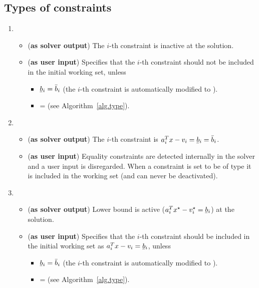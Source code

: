 \documentclass[12pt,a4paper]{article}
\newcommand{\ubar}[1]{\underaccent{\bar}{#1}}
\begin{document}
\subsection{Types of constraints}

\begin{enumerate}
\item {}

  \begin{itemize}
  \item ({\bf as solver output}) The $i$-th constraint is inactive at the solution. 
  \item ({\bf as user input}) Specifies that the $i$-th constraint should not be included in
    the initial working set, unless
    \begin{itemize}
    \item[\ding{237}] $\ubar{b}_i = \bar{b}_i$ (the $i$-th constraint is automatically modified to
      ).
    \item[\ding{237}]  =  (see Algorithm~\ref{alg.type}).
    \end{itemize}
  \end{itemize}

\item {}

  \begin{itemize}
  \item ({\bf as solver output}) The $i$-th constraint is $a_i^Tx - v_i = \ubar{b}_i = \bar{b}_i$.
  \item ({\bf as user input}) Equality constraints are detected internally in the solver and
    a user input  is disregarded. When a constraint is set to be of type
     it is included in the working set (and can never be deactivated).
  \end{itemize}

\item {}

  \begin{itemize}
  \item ({\bf as solver output}) Lower bound is active ($a_i^Tx^{\star} - v_i^{\star} = \ubar{b}_i$) at the solution.
  \item ({\bf as user input}) Specifies that the $i$-th constraint should be included in the
    initial working set as $a_i^Tx - v_i = \ubar{b}_i$, unless
    \begin{itemize}
    \item[\ding{237}] $\ubar{b}_i = \bar{b}_i$ (the $i$-th constraint is automatically modified to
      ).
    \item[\ding{237}]  =  (see Algorithm~\ref{alg.type}).
    \end{itemize}
  \end{itemize}


\end{enumerate}
\end{document}
